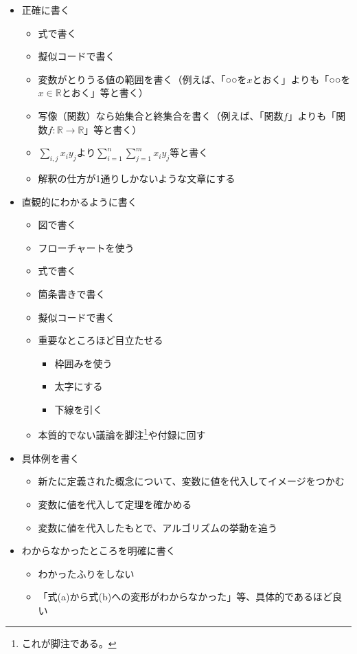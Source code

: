 \documentclass[a4j]{jsarticle}
\begin{document}
\begin{itemize}
\item 正確に書く
\begin{itemize}
\item 式で書く
\item 擬似コードで書く
\item 変数がとりうる値の範囲を書く（例えば、「○○を$x$とおく」よりも「○○を$x \in \mathbb{R}$とおく」等と書く）
\item 写像（関数）なら始集合と終集合を書く（例えば、「関数$f$」よりも「関数$f : \mathbb{R} \to \mathbb{R}$」等と書く）
\item $\sum_{i,j}x_i y_j$より$\sum_{i=1}^n \sum_{j=1}^m x_i y_j$等と書く
\item 解釈の仕方が1通りしかないような文章にする
\end{itemize}

\item 直観的にわかるように書く
\begin{itemize}
\item 図で書く
\item フローチャートを使う
\item 式で書く
\item 箇条書きで書く
\item 擬似コードで書く
\item 重要なところほど目立たせる
\begin{itemize}
\item 枠囲みを使う
\item 太字にする
\item 下線を引く
\end{itemize}
\item 本質的でない議論を脚注\footnote{これが脚注である。}や付録に回す
\end{itemize}

\item 具体例を書く
\begin{itemize}
\item 新たに定義された概念について、変数に値を代入してイメージをつかむ
\item 変数に値を代入して定理を確かめる
\item 変数に値を代入したもとで、アルゴリズムの挙動を追う
\end{itemize}

\item わからなかったところを明確に書く
\begin{itemize}
\item わかったふりをしない
\item 「式(a)から式(b)への変形がわからなかった」等、具体的であるほど良い
\end{itemize}
\end{itemize}
\end{document}
